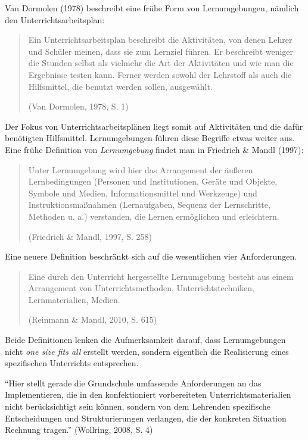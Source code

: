 \documentclass[
  10pt,
  a4paper,
  DIV=11]{scrartcl}
\begin{document}
Van Dormolen (1978) beschreibt eine frühe Form von Lernumgebungen,
nämlich den Unterrichtsarbeitsplan:

\begin{quote}
Ein Unterrichtsarbeitsplan beschreibt die Aktivitäten, von denen Lehrer
und Schüler meinen, dass sie zum Lernziel führen. Er beschreibt weniger
die Stunden selbst als vielmehr die Art der Aktivitäten und wie man die
Ergebnisse testen kann. Ferner werden sowohl der Lehrstoff als auch die
Hilfsmittel, die benutzt werden sollen, ausgewählt.

(Van Dormolen, 1978, S. 1)
\end{quote}

Der Fokus von Unterrichtsarbeitsplänen liegt somit auf Aktivitäten und
die dafür benötigten Hilfsmittel. Lernumgebungen führen diese Begriffe
etwas weiter aus. Eine frühe Definition von \emph{Lernumgebung} findet
man in Friedrich \& Mandl (1997):

\begin{quote}
Unter Lernumgebung wird hier das Arrangement der äußeren Lernbedingungen
(Personen und Institutionen, Geräte und Objekte, Symbole und Medien,
Informationsmittel und Werkzeuge) und Instruktionsmaßnahmen
(Lernaufgaben, Sequenz der Lernschritte, Methoden u. a.) verstanden, die
Lernen ermöglichen und erleichtern.

(Friedrich \& Mandl, 1997, S. 258)
\end{quote}

Eine neuere Definition beschränkt sich auf die wesentlichen vier
Anforderungen.

\begin{quote}
Eine durch den Unterricht hergestellte Lernumgebung besteht aus einem
Arrangement von Unterrichtsmethoden, Unterrichtstechniken,
Lernmaterialien, Medien.

(Reinmann \& Mandl, 2010, S. 615)
\end{quote}

Beide Definitionen lenken die Aufmerksamkeit darauf, dass Lernumgebungen
nicht \emph{one size fits all} erstellt werden, sondern eigentlich die
Realisierung eines spezifischen Unterrichts entsprechen.

``Hier stellt gerade die Grundschule umfassende Anforderungen an das
Implementieren, die in den konfektioniert vorbereiteten
Unterrichtsmaterialien nicht berücksichtigt sein können, sondern von dem
Lehrenden spezifische Entscheidungen und Strukturierungen verlangen, die
der konkreten Situation Rechnung tragen.'' (Wollring, 2008, S. 4)
\end{document}
